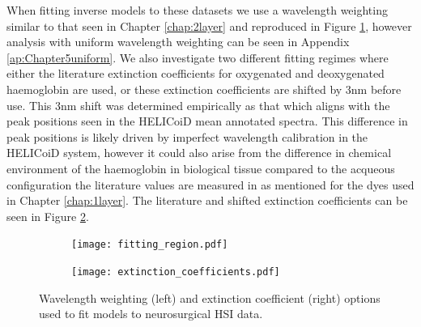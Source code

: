 When fitting inverse models to these datasets we use a wavelength weighting similar to that seen in Chapter \ref{chap:2layer} and reproduced in Figure \ref{fig:weightings}, however analysis with uniform wavelength weighting can be seen in Appendix \ref{ap:Chapter5uniform}. We also investigate two different fitting regimes where either the literature extinction coefficients for oxygenated and deoxygenated haemoglobin are used, or these extinction coefficients are shifted by 3nm before use. This 3nm shift was determined empirically as that which aligns with the peak positions seen in the HELICoiD mean annotated spectra. This difference in peak positions is likely driven by imperfect wavelength calibration in the HELICoiD system, however it could also arise from the difference in chemical environment of the haemoglobin in biological tissue compared to the acqueous configuration the literature values are measured in as mentioned for the dyes used in Chapter \ref{chap:1layer}. The literature and shifted extinction coefficients can be seen in Figure \ref{fig:extinctioncoeffs}.
\begin{figure}[h!]
    \centering
    \begin{subfigure}{0.49\textwidth}
        \texttt{[image: fitting\_region.pdf]}
        \caption{}
        \label{fig:weightings}
    \end{subfigure}
    \begin{subfigure}{0.49\textwidth}
        \texttt{[image: extinction\_coefficients.pdf]}
        \caption{}
        \label{fig:extinctioncoeffs}
    \end{subfigure}
    \caption{Wavelength weighting (left) and extinction coefficient (right) options used to fit models to neurosurgical HSI data.}
    \label{fig:fittingoptions}
\end{figure}

